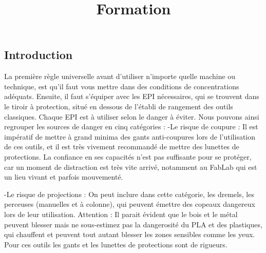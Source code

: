 \documentclass[14pt]{formation}
\title{Formation} %
\begin{document}

    \fairepagedegardeVun  %
    \fairemarges   %
    \tableofcontents %


    \subsection{Introduction}
    La première règle universelle avant d’utiliser n’importe quelle machine ou technique, est qu’il faut vous mettre dans des conditions de concentrations adéquats. Ensuite, il faut s’équiper avec les EPI nécessaires, qui se trouvent dans le tiroir à protection, situé en dessous de l’établi de rangement des outils classiques.	
	Chaque EPI est à utiliser selon le danger à éviter. Nous pouvons ainsi regrouper les sources de danger en cinq catégories : 
	-Le risque de coupure : Il est impératif de mettre à grand minima des gants anti-coupures lors de l’utilisation de ces outils, et il est très vivement recommandé de mettre des lunettes de protections. La confiance en ses capacités n’est pas suffisante pour se protéger, car un moment de distraction est très vite arrivé, notamment au FabLab qui est un lieu vivant et parfois mouvementé.

	-Le risque de projections : On peut inclure dans cette catégorie, les dremels, les perceuses (manuelles et à colonne), qui peuvent émettre des copeaux dangereux lors de leur utilisation. Attention : Il parait évident que le bois et le métal peuvent blesser mais ne sous-estimez pas la dangerosité du PLA et des plastiques, qui chauffent et peuvent tout autant blesser les zones sensibles comme les yeux. Pour ces outils les gants et les lunettes de protections sont de rigueurs. 
	
\end{document}
